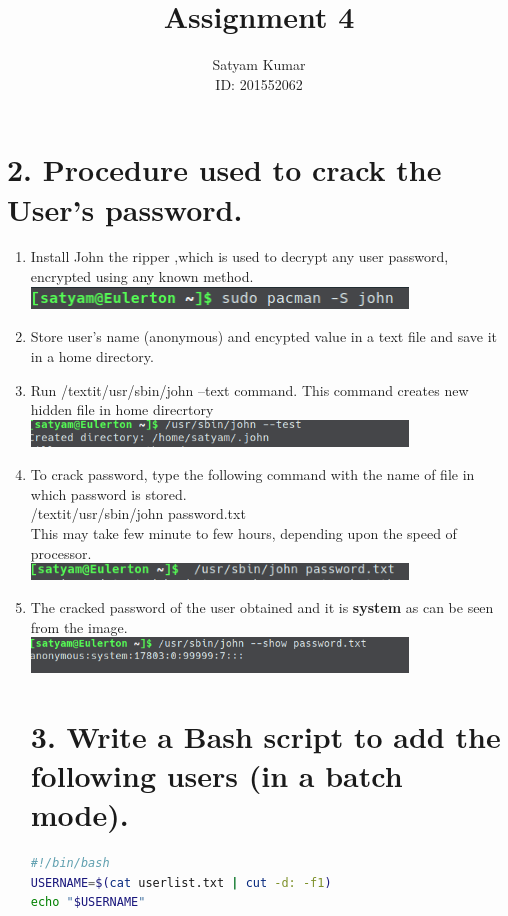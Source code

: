 \documentclass[11pt,a4]{article}
\title{\textbf{Assignment 4}}   %
\author{Satyam Kumar \\ ID: 201552062} %
\date{}
\begin{document}
\maketitle
\section*{2. Procedure used to crack the User's password.}
\begin{enumerate}
	\item 	Install John the ripper ,which is used to decrypt any user password, encrypted using any known method.\\
\includegraphics[width=10cm]{install.png}
\item Store user's name (anonymous) and encypted value in a text file and save it in a home directory.
\item Run /textit{/usr/sbin/john --text} command. This command creates new hidden file in home direcrtory\\
\includegraphics[width=10cm]{test.png}
\item  To crack password, type the following command with the name of file in which password is stored. \\
/textit{/usr/sbin/john password.txt}\\This may take few minute to few hours, depending upon the speed of processor.\\
\includegraphics[width=10cm]{PW_text.png}
\item The cracked password of the user obtained and it is \textbf{system} as can be seen from the image.\\
\includegraphics[width=10cm]{PW_cracked.png}
\section*{3. Write a Bash script to add the following users (in a batch mode).}
\begin{lstlisting}[language=bash]
#!/bin/bash
USERNAME=$(cat userlist.txt | cut -d: -f1)
echo "$USERNAME"


\end{lstlisting}
\end{enumerate}
\end{document}
